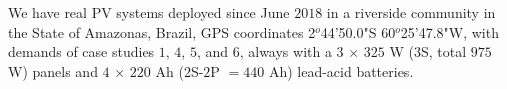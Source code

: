 \documentclass[10pt,journal,compsoc]{IEEEtran}
\begin{document}

%

We have real PV systems deployed since June $2018$ in a riverside community in the State of Amazonas, Brazil, GPS coordinates 2$^{o}$44'50.0"S 60$^{o}$25'47.8"W, with demands of case studies $1$, $4$, $5$, and $6$, always with a $3$ $\times$ $325$ W ($3$S, total $975$ W) panels and $4$ $\times$ $220$ Ah ($2$S-$2$P $= 440$ Ah) lead-acid batteries.
\end{document}
